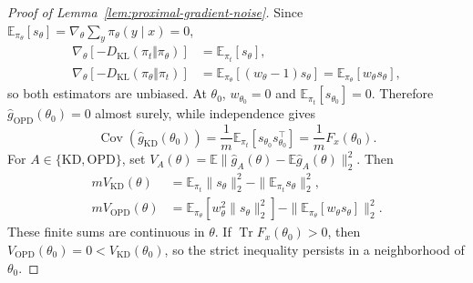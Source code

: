\begin{proof}[Proof of Lemma~\ref{lem:proximal-gradient-noise}]
Since $\mathbb E_{\pi_\theta}[s_\theta]=\nabla_\theta\sum_y\pi_\theta(y\mid x)=0$,
\begin{align}
 \nabla_\theta[-D_{\mathrm{KL}}(\pi_t\Vert\pi_\theta)]
 &=\mathbb E_{\pi_t}[s_\theta],
 \label{eq:proximal-kd-gradient}\\
 \nabla_\theta[-D_{\mathrm{KL}}(\pi_\theta\Vert\pi_t)]
 &=\mathbb E_{\pi_\theta}[(w_\theta-1)s_\theta]
 =\mathbb E_{\pi_\theta}[w_\theta s_\theta],
 \label{eq:proximal-opd-gradient}
\end{align}
so both estimators are unbiased. At $\theta_0$, $w_{\theta_0}=0$ and
$\mathbb E_{\pi_t}[s_{\theta_0}]=0$. Therefore
$\widehat g_{\mathrm{OPD}}(\theta_0)=0$ almost surely, while independence gives
\begin{equation}
 \operatorname{Cov}(\widehat g_{\mathrm{KD}}(\theta_0))
 =\frac1m\mathbb E_{\pi_t}[s_{\theta_0}s_{\theta_0}^{\top}]
 =\frac1m F_x(\theta_0).
 \label{eq:app-proximal-fisher}
\end{equation}
For $A\in\{\mathrm{KD},\mathrm{OPD}\}$, set
$V_A(\theta)=\mathbb E\|\widehat g_A(\theta)
-\mathbb E\widehat g_A(\theta)\|_2^2$.
Then
\begin{align}
 mV_{\mathrm{KD}}(\theta)
 &=\mathbb E_{\pi_t}\|s_\theta\|_2^2
       -\|\mathbb E_{\pi_t}s_\theta\|_2^2,\nonumber\\
 mV_{\mathrm{OPD}}(\theta)
 &=\mathbb E_{\pi_\theta}[w_\theta^2\|s_\theta\|_2^2]
       -\|\mathbb E_{\pi_\theta}[w_\theta s_\theta]\|_2^2.
 \label{eq:proximal-estimation-error}
\end{align}
These finite sums are continuous in $\theta$. If
$\operatorname{Tr}F_x(\theta_0)>0$, then
$V_{\mathrm{OPD}}(\theta_0)=0<V_{\mathrm{KD}}(\theta_0)$, so the strict
inequality persists in a neighborhood of $\theta_0$.
\end{proof}
